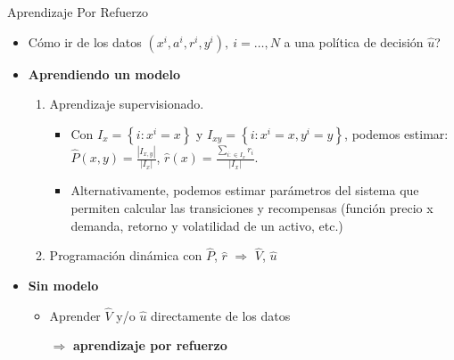 \documentclass[handout]{beamer}
\begin{document}
\begin{frame}{Aprendizaje Por Refuerzo}
\begin{itemize}
\item Cómo ir de los datos $(x^i,a^i,r^i,y^i),~i=\dots,N$ a una política de decisión $\hat u$?
\item<2-> \textbf{Aprendiendo un modelo}
\begin{enumerate}
\item<3-> Aprendizaje supervisionado.
\begin{itemize}
\item<4-> Con $I_x = \left\{i: x^i = x\right\}$ y $I_{xy} =\left\{i:x^i=x,y^i=y\right\}$, podemos estimar:
$\hat P(x,y) = \frac{|I_{x,y}|}{|I_x|}$, $\hat r(x) = \frac{\sum_{i: \in I_x} r_i}{|I_x|}$.
\item<5-> Alternativamente, podemos estimar parámetros del sistema que permiten calcular las transiciones y recompensas (función precio x demanda, retorno y volatilidad de un activo, etc.)
\end{itemize}
\item<6-> Programación dinámica con $\hat P$, $\hat r$ $\Rightarrow$ $\hat V$, $\hat u$
\end{enumerate}
\item<7->\textbf{ Sin modelo}
\begin{itemize}
\item Aprender $\hat V$ y/o $\hat u$ directamente de los datos 

$\Rightarrow$ \textbf{aprendizaje por refuerzo } 
\end{itemize}
\end{itemize}
\end{frame}
\end{document}
